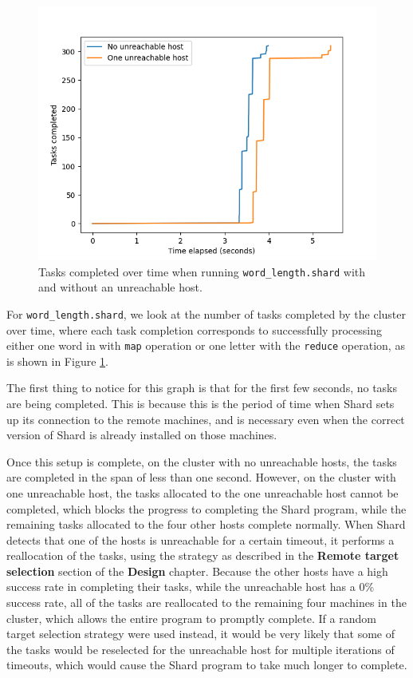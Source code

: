 \documentclass[oneside]{report}
\begin{document}
\begin{figure}[h]
  \begin{center}
    \includegraphics[scale=0.9]{img/experiments/e4_1620960581241.png}
    \caption{Tasks completed over time when running \texttt{word\_length.shard} with and without an unreachable host.}
    \label{fig:unreachable}
  \end{center}
\end{figure}

For \texttt{word\_length.shard}, we look at the number of tasks completed by the cluster over time, where each task completion corresponds to successfully processing either one word in with \texttt{map} operation or one letter with the \texttt{reduce} operation, as is shown in Figure \ref{fig:unreachable}.

The first thing to notice for this graph is that for the first few seconds, no tasks are being completed.
This is because this is the period of time when Shard sets up its connection to the remote machines, and is necessary even when the correct version of Shard is already installed on those machines.

Once this setup is complete, on the cluster with no unreachable hosts, the tasks are completed in the span of less than one second.
However, on the cluster with one unreachable host, the tasks allocated to the one unreachable host cannot be completed, which blocks the progress to completing the Shard program, while the remaining tasks allocated to the four other hosts complete normally.
When Shard detects that one of the hosts is unreachable for a certain timeout, it performs a reallocation of the tasks, using the strategy as described in the \textbf{Remote target selection} section of the \textbf{Design} chapter.
Because the other hosts have a high success rate in completing their tasks, while the unreachable host has a 0\% success rate, all of the tasks are reallocated to the remaining four machines in the cluster, which allows the entire program to promptly complete.
If a random target selection strategy were used instead, it would be very likely that some of the tasks would be reselected for the unreachable host for multiple iterations of timeouts, which would cause the Shard program to take much longer to complete.
\end{document}
